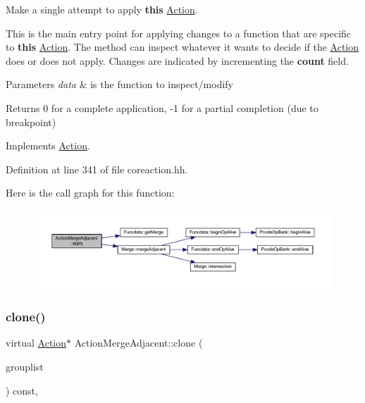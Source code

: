 Make a single attempt to apply {\bfseries{this}} \mbox{\hyperlink{class_action}{Action}}. 

This is the main entry point for applying changes to a function that are specific to {\bfseries{this}} \mbox{\hyperlink{class_action}{Action}}. The method can inspect whatever it wants to decide if the \mbox{\hyperlink{class_action}{Action}} does or does not apply. Changes are indicated by incrementing the {\bfseries{count}} field. 
\begin{DoxyParams}{Parameters}
{\em data} & is the function to inspect/modify \\
\hline
\end{DoxyParams}
\begin{DoxyReturn}{Returns}
0 for a complete application, -\/1 for a partial completion (due to breakpoint) 
\end{DoxyReturn}


Implements \mbox{\hyperlink{class_action_aac1c3999d6c685b15f5d9765a4d04173}{Action}}.



Definition at line 341 of file coreaction.\+hh.

Here is the call graph for this function\+:
\nopagebreak
\begin{figure}[H]
\begin{center}
\leavevmode
\includegraphics[width=350pt]{class_action_merge_adjacent_aa6319f917bac228ae065205c84efb5e1_cgraph}
\end{center}
\end{figure}
\mbox{\label{class_action_merge_adjacent_af7ddb17ea086b27efa6461076a258c54}} 
\subsubsection{\texorpdfstring{clone()}{clone()}}
{\footnotesize\ttfamily virtual \mbox{\hyperlink{class_action}{Action}}$\ast$ Action\+Merge\+Adjacent\+::clone (\begin{DoxyParamCaption}\item[{const \mbox{\hyperlink{class_action_group_list}{Action\+Group\+List}} \&}]{grouplist }\end{DoxyParamCaption}) const\hspace{0.3cm}{\ttfamily [inline]}, {\ttfamily [virtual]}}



